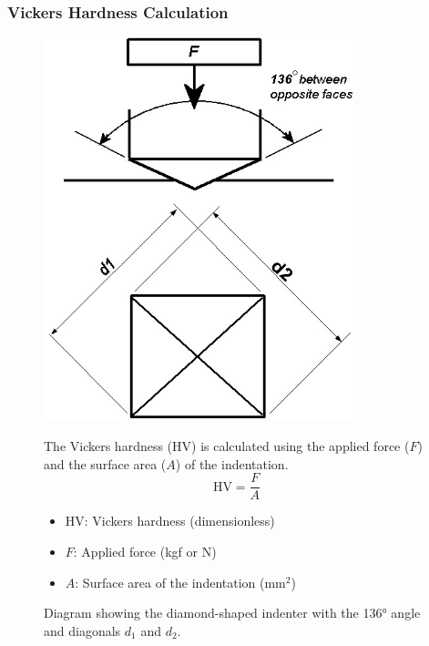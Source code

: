 \documentclass{article}
\begin{document}
    \subsubsection{Vickers Hardness Calculation}\label{VHC}
    \begin{figure}[H]
        \centering
        \begin{minipage}{0.45\textwidth}\centering
            \vspace{1em}\includegraphics[width=0.8\textwidth]{figures/3537580_orig-0000.jpg}
            \caption{Diagram showing the diamond-shaped indenter with the 136° angle and diagonals \(d_1\) and \(d_2\).}
            \label{fig:vickers-diagram}
        \end{minipage}\hfill
        \begin{minipage}{0.51\textwidth}
            The Vickers hardness (HV) is calculated using the applied force (\(F\)) and the surface area (\(A\)) of the indentation. 
            \begin{equation}
                \text{HV} = \frac{F}{A}
            \end{equation}
            \begin{itemize}[itemsep=-1mm]
                \item HV: Vickers hardness (dimensionless)
                \item \(F\): Applied force (kgf or N)
                \item \(A\): Surface area of the indentation (mm\(^2\))
                

\end{itemize}
\end{minipage}
\end{figure}
\end{document}
